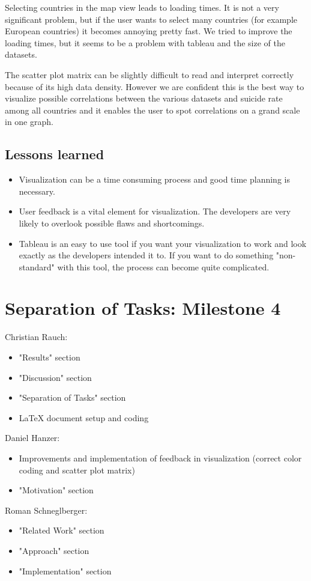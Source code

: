 \documentclass{vgtc}                          %
\begin{document}
Selecting countries in the map view leads to loading times. It is not a very significant problem, but if the user wants to select many countries (for example European countries) it becomes annoying pretty fast. We tried to improve the loading times, but it seems to be a problem with tableau and the size of the datasets.

The scatter plot matrix can be slightly difficult to read and interpret correctly because of its high data density. However we are confident this is the best way to visualize possible correlations between the various datasets and suicide rate among all countries and it enables the user to spot correlations on a grand scale in one graph.

\subsection{Lessons learned}

\begin{itemize}
\item Visualization can be a time consuming process and good time planning is necessary.
\item User feedback is a vital element for visualization. The developers are very likely to overlook possible flaws and shortcomings.
\item Tableau is an easy to use tool if you want your visualization to work and look exactly as the developers intended it to. If you want to do something "non-standard" with this tool, the process can become quite complicated.
\end{itemize}

\section{Separation of Tasks: Milestone 4}
Christian Rauch:
\begin{itemize}
\item "Results" section
\item "Discussion" section
\item "Separation of Tasks" section
\item LaTeX document setup and coding
\end{itemize}

Daniel Hanzer:
\begin{itemize}
\item Improvements and implementation of feedback in visualization (correct color coding and scatter plot matrix)
\item "Motivation" section
\end{itemize}

Roman Schneglberger:
\begin{itemize}
\item "Related Work" section
\item "Approach" section
\item "Implementation" section
\end{itemize}
\end{document}

